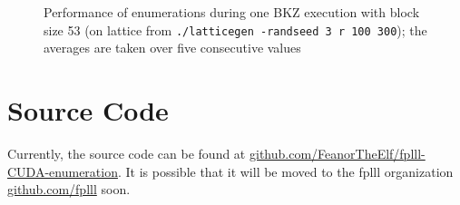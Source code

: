 \documentclass{scrartcl}
\begin{document}
    \begin{figure}[H]
        \caption{Performance of enumerations during one BKZ execution with block size 53 (on lattice from \texttt{./latticegen -randseed 3 r 100 300}); the averages are taken over five consecutive values\label{fig:bkz_graph}}
    \end{figure}

    \section{Source Code}

    Currently, the source code can be found at \href{https://github.com/FeanorTheElf/fplll-CUDA-enumeration}{github.com/FeanorTheElf/fplll-CUDA-enumeration}. It is possible that it will be moved to the fplll organization \href{https://github.com/fplll}{github.com/fplll} soon.

    \printbibliography
\end{document}
